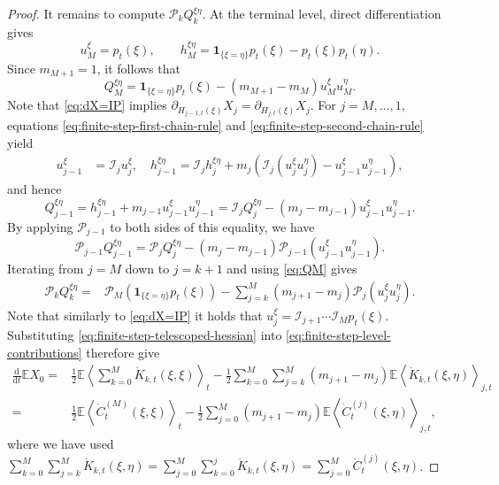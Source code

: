 \documentclass[11pt]{article}
\numberwithin{equation}{section}
\newcommand{\E}{\mathbb{E}}
\newcommand{\1}{\mathbf 1}
\begin{document}
\begin{proof}
It remains to compute $\mathcal P_kQ_k^{\xi\eta}$.  At the terminal
level, direct differentiation gives
\[
u_M^\xi=p_t(\xi),\qquad
h_M^{\xi\eta}
=\mathbf 1_{\{\xi=\eta\}}p_t(\xi)-p_t(\xi)p_t(\eta).
\]
Since $m_{M+1}=1$, it follows that
\begin{equation}\label{eq:QM}
Q_M^{\xi\eta}
=\mathbf 1_{\{\xi=\eta\}}p_t(\xi)
-(m_{M+1}-m_M)u_M^\xi u_M^\eta.
\end{equation}
Note that \eqref{eq:dX=IP} implies $\partial_{H_{j-1,t}(\xi)}X_j = \partial_{H_{j,t}(\xi)}X_j$.
For $j=M,\ldots,1$, equations
\eqref{eq:finite-step-first-chain-rule} and
\eqref{eq:finite-step-second-chain-rule} yield
\begin{align*}
u_{j-1}^\xi
&=\mathcal I_ju_j^\xi, \quad 
h_{j-1}^{\xi\eta}
=\mathcal I_jh_j^{\xi\eta}
+m_j\left(
\mathcal I_j(u_j^\xi u_j^\eta)
-u_{j-1}^\xi u_{j-1}^\eta
\right),
\end{align*}
and hence
\[
Q_{j-1}^{\xi\eta}=h_{j-1}^{\xi\eta}+m_{j-1}u_{j-1}^\xi u_{j-1}^\eta
=\mathcal I_jQ_j^{\xi\eta}
-(m_j-m_{j-1})u_{j-1}^\xi u_{j-1}^\eta.
\]
By applying $\mathcal P_{j-1}$ to both sides of this equality, we have
\[
\mathcal P_{j-1}Q_{j-1}^{\xi\eta}
=\mathcal P_jQ_j^{\xi\eta}
-(m_j-m_{j-1})
\mathcal P_{j-1}(u_{j-1}^\xi u_{j-1}^\eta).
\]
Iterating from $j=M$ down to $j=k+1$ and using \eqref{eq:QM}
gives
\begin{align}
\mathcal P_kQ_k^{\xi\eta}
={}&\mathcal P_M
\left(\mathbf 1_{\{\xi=\eta\}}p_t(\xi)\right)
-\sum_{j=k}^M(m_{j+1}-m_j)
\mathcal P_j(u_j^\xi u_j^\eta).
\label{eq:finite-step-telescoped-hessian}
\end{align}
Note that similarly to \eqref{eq:dX=IP} it holds that $u_j^\xi =\mathcal I_{j+1}\cdots\mathcal I_Mp_t(\xi)$.
Substituting \eqref{eq:finite-step-telescoped-hessian} into
\eqref{eq:finite-step-level-contributions} therefore give
\begin{align*}
   \frac{\mathrm d}{\mathrm dt}\E X_0 
={}&\frac12\E\left\langle
\sum_{k=0}^M\dot K_{k,t}(\xi,\xi)
\right\rangle_t-\frac12\sum_{k=0}^M\sum_{j=k}^M(m_{j+1}-m_j)
\E\left\langle
\dot K_{k,t}(\xi,\eta)
\right\rangle_{j,t}\\
={}&\frac12\E\left\langle
\dot C_t^{(M)}(\xi,\xi)
\right\rangle_t
-\frac12\sum_{j=0}^M(m_{j+1}-m_j)
\E\left\langle
\dot C_t^{(j)}(\xi,\eta)
\right\rangle_{j,t},
\end{align*}
where we have used $\sum_{k=0}^M\sum_{j=k}^M\dot K_{k,t}(\xi,\eta)=\sum_{j=0}^M\sum_{k=0}^j \dot K_{k,t}(\xi,\eta)=\sum_{j=0}^M \dot C_t^{(j)}(\xi,\eta)$.
\end{proof}
\end{document}
